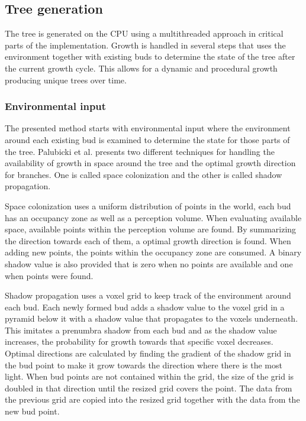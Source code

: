\documentclass[11pt]{article} %
\begin{document}
\subsection{Tree generation}
The tree is generated on the CPU using a multithreaded approach in critical parts of the implementation.
Growth is handled in several steps that uses the environment together with existing buds to determine the state of the tree after the current growth cycle.
This allows for a dynamic and procedural growth producing unique trees over time.

\subsubsection{Environmental input}
The presented method starts with environmental input where the environment around each existing bud is examined to determine the state for those parts of the tree.
Palubicki et al.\cite{Palubicki:2009:STM:1531326.1531364} presents two different techniques for handling the availability of growth in space around the tree and the optimal growth direction for branches.
One is called space colonization and the other is called shadow propagation.

Space colonization uses a uniform distribution of points in the world, each bud has an occupancy zone as well as a perception volume.
When evaluating available space, available points within the perception volume are found.
By summarizing the direction towards each of them, a optimal growth direction is found.
When adding new points, the points within the occupancy zone are consumed.
A binary shadow value is also provided that is zero when no points are available and one when points were found.

Shadow propagation uses a voxel grid to keep track of the environment around each bud.
Each newly formed bud adds a shadow value to the voxel grid in a pyramid below it with a shadow value that propagates to the voxels underneath.
This imitates a prenumbra shadow from each bud and as the shadow value increases, the probability for growth towards that specific voxel decreases.
Optimal directions are calculated by finding the gradient of the shadow grid in the bud point to make it grow towards the direction where there is the most light.
When bud points are not contained within the grid, the size of the grid is doubled in that direction until the resized grid covers the point.
The data from the previous grid are copied into the resized grid together with the data from the new bud point.\cite{Palubicki:2009:STM:1531326.1531364}
\end{document}
